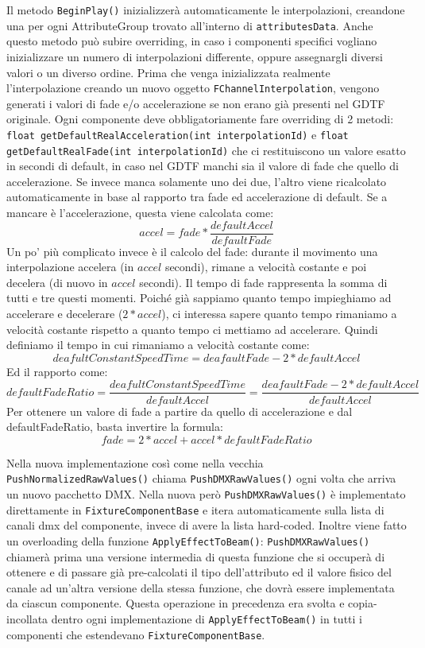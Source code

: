 \documentclass[main.tex]{subfiles}
\begin{document}
Il metodo \lstinline{BeginPlay()} inizializzerà automaticamente le interpolazioni, creandone una per ogni AttributeGroup trovato all'interno di \lstinline{attributesData}. Anche questo metodo può subire overriding, in caso i componenti specifici vogliano inizializzare un numero di interpolazioni differente, oppure assegnargli diversi valori o un diverso ordine. Prima che venga inizializzata realmente l'interpolazione creando un nuovo oggetto \lstinline{FChannelInterpolation}, vengono generati i valori di fade e/o accelerazione se non erano già presenti nel GDTF originale. Ogni componente deve obbligatoriamente fare overriding di 2 metodi: \lstinline{float getDefaultRealAcceleration(int interpolationId)} e \lstinline{float getDefaultRealFade(int interpolationId)} che ci restituiscono un valore esatto in secondi di default, in caso nel GDTF manchi sia il valore di fade che quello di accelerazione. Se invece manca solamente uno dei due, l'altro viene ricalcolato automaticamente in base al rapporto tra fade ed accelerazione di default. Se a mancare è l'accelerazione, questa viene calcolata come:
\[accel = fade * \frac{defaultAccel}{defaultFade}\]
Un po' più complicato invece è il calcolo del fade: durante il movimento una interpolazione accelera (in $accel$ secondi), rimane a velocità costante e poi decelera (di nuovo in $accel$ secondi). Il tempo di fade rappresenta la somma di tutti e tre questi momenti. Poiché già sappiamo quanto tempo impieghiamo ad accelerare e decelerare ($2 * accel$), ci interessa sapere quanto tempo rimaniamo a velocità costante rispetto a quanto tempo ci mettiamo ad accelerare. Quindi definiamo il tempo in cui rimaniamo a velocità costante come:
\[deafultConstantSpeedTime = deafaultFade - 2 * defaultAccel\] 
Ed il rapporto come:
\[defaultFadeRatio = \frac{deafultConstantSpeedTime}{defaultAccel} = \frac{deafaultFade - 2 * defaultAccel}{defaultAccel}\]
Per ottenere un valore di fade a partire da quello di accelerazione e dal defaultFadeRatio, basta invertire la formula:
\[fade = 2 * accel + accel * defaultFadeRatio\]

Nella nuova implementazione così come nella vecchia \lstinline{PushNormalizedRawValues()} chiama \lstinline{PushDMXRawValues()} ogni volta che arriva un nuovo pacchetto DMX. Nella nuova però \lstinline{PushDMXRawValues()} è implementato direttamente in \lstinline{FixtureComponentBase} e itera automaticamente sulla lista di canali dmx del componente, invece di avere la lista hard-coded. Inoltre viene fatto un overloading della funzione \lstinline{ApplyEffectToBeam()}: \lstinline{PushDMXRawValues()} chiamerà prima una versione intermedia di questa funzione che si occuperà di ottenere e di passare già pre-calcolati il tipo dell'attributo ed il valore fisico del canale ad un'altra versione della stessa funzione, che dovrà essere implementata da ciascun componente. Questa operazione in precedenza era svolta e copia-incollata dentro ogni implementazione di \lstinline{ApplyEffectToBeam()} in tutti i componenti che estendevano \lstinline{FixtureComponentBase}.
\end{document}
